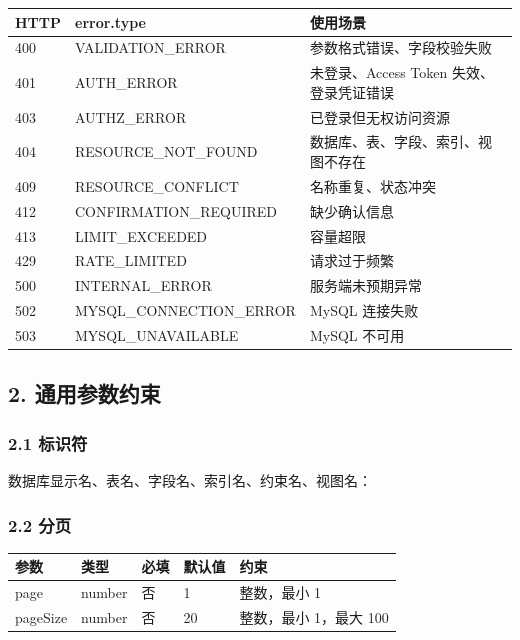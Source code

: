 \documentclass[
  a4paper,
  UTF8]{ctexart}
\newenvironment{Shaded}{}{}
\newcommand{\NormalTok}[1]{#1}
\begin{document}
\begin{longtable}[]{@{}lll@{}}
\toprule
HTTP & error.type & 使用场景 \\
\midrule
\endhead
400 & VALIDATION\_ERROR & 参数格式错误、字段校验失败 \\
401 & AUTH\_ERROR & 未登录、Access Token 失效、登录凭证错误 \\
403 & AUTHZ\_ERROR & 已登录但无权访问资源 \\
404 & RESOURCE\_NOT\_FOUND & 数据库、表、字段、索引、视图不存在 \\
409 & RESOURCE\_CONFLICT & 名称重复、状态冲突 \\
412 & CONFIRMATION\_REQUIRED & 缺少确认信息 \\
413 & LIMIT\_EXCEEDED & 容量超限 \\
429 & RATE\_LIMITED & 请求过于频繁 \\
500 & INTERNAL\_ERROR & 服务端未预期异常 \\
502 & MYSQL\_CONNECTION\_ERROR & MySQL 连接失败 \\
503 & MYSQL\_UNAVAILABLE & MySQL 不可用 \\
\bottomrule
\end{longtable}

\hypertarget{ux901aux7528ux53c2ux6570ux7ea6ux675f}{%
\subsection{2.
通用参数约束}\label{ux901aux7528ux53c2ux6570ux7ea6ux675f}}

\hypertarget{ux6807ux8bc6ux7b26}{%
\subsubsection{2.1 标识符}\label{ux6807ux8bc6ux7b26}}

数据库显示名、表名、字段名、索引名、约束名、视图名：

\begin{Shaded}
\end{Shaded}

\hypertarget{ux5206ux9875}{%
\subsubsection{2.2 分页}\label{ux5206ux9875}}

\begin{longtable}[]{@{}lllll@{}}
\toprule
参数 & 类型 & 必填 & 默认值 & 约束 \\
\midrule
\endhead
page & number & 否 & 1 & 整数，最小 1 \\
pageSize & number & 否 & 20 & 整数，最小 1，最大 100 \\
\bottomrule
\end{longtable}
\end{document}
